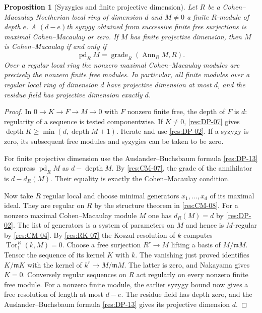 \documentclass[11pt,oneside,openany]{book}
\newtheorem{proposition}[theorem]{Proposition}
\theoremstyle{definition}
\theoremstyle{remark}
\begin{document}
\begin{proposition}[Syzygies and finite projective dimension]
\label{res:CM-12}
Let $R$ be a Cohen--Macaulay Noetherian local ring of
dimension $d$ and $M\ne0$ a finite $R$-module of depth $e$.
A $(d-e)$th syzygy obtained from successive finite free
surjections is maximal Cohen--Macaulay or zero. If $M$ has
finite projective dimension, then $M$ is Cohen--Macaulay
if and only if
\[
 \operatorname{pd}_R M=\operatorname{grade}_R(\operatorname{Ann}_R M,R).
\]
Over a regular local ring the nonzero maximal
Cohen--Macaulay modules are precisely the nonzero finite
free modules. In particular, all finite modules over a
regular local ring of dimension $d$ have projective
dimension at most $d$, and the residue field has projective
dimension exactly $d$.
\end{proposition}
\begin{proof}
In $0\to K\to F\to M\to0$ with $F$ nonzero finite free,
the depth of $F$ is $d$: regularity of a sequence is tested
componentwise. If $K\ne0$, \ref{res:DP-07} gives
$\operatorname{depth}K\ge\min(d,\operatorname{depth}M+1)$.
Iterate and use \ref{res:DP-02}. If a syzygy is zero, its
subsequent free modules and syzygies can be taken to be zero.

For finite projective dimension use the Auslander--Buchsbaum
formula \ref{res:DP-13} to express $\operatorname{pd}_R M$
as $d-\operatorname{depth}M$. By \ref{res:CM-07},
the grade of the annihilator is $d-d_R(M)$. Their equality
is exactly the Cohen--Macaulay condition.

Now take $R$ regular local and choose minimal generators
$x_1,\ldots,x_d$ of its maximal ideal. They are regular
on $R$ by the structure theorem in \ref{res:CM-08}.
For a nonzero maximal Cohen--Macaulay module $M$ one has
$d_R(M)=d$ by \ref{res:DP-02}. The list of generators is a
system of parameters on $M$ and hence is $M$-regular by
\ref{res:CM-04}. By \ref{res:RK-07} the Koszul resolution
of $k$ computes $\operatorname{Tor}_1^R(k,M)=0$. Choose a
free surjection $R^r\to M$ lifting a basis of $M/\mathfrak mM$.
Tensor the sequence of its kernel $K$ with $k$. The vanishing
just proved identifies $K/\mathfrak mK$ with the kernel of
$k^r\to M/\mathfrak mM$. The latter is zero, and Nakayama
gives $K=0$. Conversely regular sequences on $R$ act
regularly on every nonzero finite free module.
For a nonzero finite module, the earlier syzygy bound
now gives a free resolution of length at most $d-e$.
The residue field has depth zero, and the
Auslander--Buchsbaum formula \ref{res:DP-13} gives its
projective dimension $d$.
\end{proof}
\end{document}
